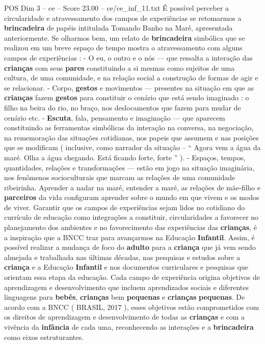 \begin{textsample}{POS Dim 3 – ce – Score 23.00 – ce/ce\_inf\_11.txt}
É possível perceber a circularidade e atravessamento dos campos de experiências se retomarmos a \textbf{brincadeira} de papéis intitulada Tomando Banho na Maré, apresentada anteriormente.
Se olharmos bem, um relato de \textbf{brincadeira} simbólica que se realizou em um breve espaço de tempo mostra o atravessamento com alguns campos de experiências : - O eu, o outro e o nós — que ressalta a interação das \textbf{crianças} com seus \textbf{pares} constituindo a si mesmas como sujeitos de uma cultura, de uma comunidade, e na relação social a construção de formas de agir e se relacionar. - Corpo, \textbf{gestos} e movimentos — presentes na situação em que as \textbf{crianças} fazem \textbf{gestos} para constituir o cenário que está sendo imaginado : o filho na beira do rio, no braço, nos deslocamentos que fazem para mudar de cenário etc. - \textbf{Escuta}, fala, pensamento e imaginação — que aparecem constituindo as ferramentas simbólicas da interação na conversa, na negociação, na rememoração das situações cotidianas, nos papeis que assumem e nas posições que se modificam ( inclusive, como narrador da situação – “ Agora vem a água da maré.
Olha a água chegando.
Está ficando forte, forte ” ). - Espaços, tempos, quantidades, relações e transformações — estão em jogo na situação imaginária, nos fenômenos socioculturais que marcam as relações de uma comunidade ribeirinha.
Aprender a nadar na maré, entender a maré, as relações de mãe-filho e \textbf{parceiros} da vida configuram aprender sobre o mundo em que vivem e os modos de viver.
Garantir que os campos de experiências sejam lidos no cotidiano do currículo de educação como integrações a constituir, circularidades a favorecer no planejamento dos ambientes e no favorecimento das experiências das \textbf{crianças}, é a inspiração que a BNCC traz para avançarmos na Educação \textbf{Infantil}.
Assim, é possível realizar a mudança de foco do \textbf{adulto} para a \textbf{criança} que já vem sendo almejada e trabalhada nas últimas décadas, nas pesquisas e estudos sobre a \textbf{criança} e a Educação \textbf{Infantil} e nos documentos curriculares e pesquisas que orientam essa etapa da educação.
Cada campo de experiência origina objetivos de aprendizagem e desenvolvimento que incluem aprendizados sociais e diferentes linguagens para \textbf{bebês}, \textbf{crianças} bem \textbf{pequenas} e \textbf{crianças} \textbf{pequenas}.
De acordo com a BNCC ( BRASIL, 2017 ), esses objetivos estão comprometidos com os direitos de aprendizagem e desenvolvimento de todas as \textbf{crianças} e com a vivência da \textbf{infância} de cada uma, reconhecendo as interações e a \textbf{brincadeira} como eixos estruturantes.

\end{textsample}
